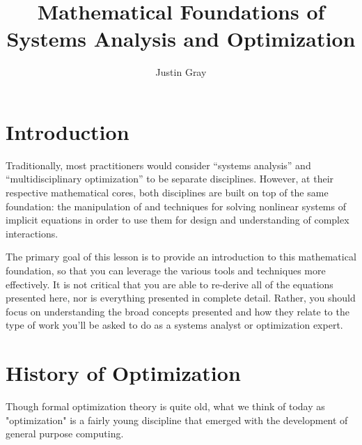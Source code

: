 \documentclass[conf]{new-aiaa}
\begin{document}
\title{Mathematical Foundations of Systems Analysis and Optimization}
\author{Justin Gray}

\maketitle


\section{Introduction}
    Traditionally, most practitioners would consider ``systems analysis'' and ``multidisciplinary optimization'' to be separate disciplines. 
    However, at their respective mathematical cores, both disciplines are built on top of the same foundation: 
    the manipulation of and techniques for solving nonlinear systems of implicit equations in order to use them for design and understanding of complex interactions.

    The primary goal of this lesson is to provide an introduction to this mathematical foundation, 
    so that you can leverage the various tools and techniques more effectively. 
    It is not critical that you are able to re-derive all of the equations presented here, nor is everything presented in complete detail. 
    Rather, you should focus on understanding the broad concepts presented and how they relate to the type of work you'll be asked to do as a 
    systems analyst or optimization expert. 


\section{History of Optimization}


\noindent Though formal optimization theory is quite old, what we think of today as "optimization" is a fairly young discipline that emerged with the development of general purpose computing. 
\end{document}
